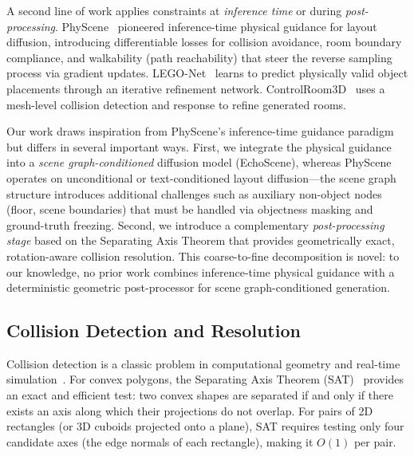 A second line of work applies constraints at \emph{inference time} or during \emph{post-processing}.
PhyScene~\cite{placeholder_physcene} pioneered inference-time physical guidance for layout diffusion, introducing differentiable losses for collision avoidance, room boundary compliance, and walkability (path reachability) that steer the reverse sampling process via gradient updates.
LEGO-Net~\cite{placeholder_legonet} learns to predict physically valid object placements through an iterative refinement network.
ControlRoom3D~\cite{placeholder_controlroom3d} uses a mesh-level collision detection and response to refine generated rooms.

Our work draws inspiration from PhyScene's inference-time guidance paradigm but differs in several important ways.
First, we integrate the physical guidance into a \emph{scene graph-conditioned} diffusion model (EchoScene), whereas PhyScene operates on unconditional or text-conditioned layout diffusion---the scene graph structure introduces additional challenges such as auxiliary non-object nodes (floor, scene boundaries) that must be handled via objectness masking and ground-truth freezing.
Second, we introduce a complementary \emph{post-processing stage} based on the Separating Axis Theorem that provides geometrically exact, rotation-aware collision resolution.
This coarse-to-fine decomposition is novel: to our knowledge, no prior work combines inference-time physical guidance with a deterministic geometric post-processor for scene graph-conditioned generation.

\subsection{Collision Detection and Resolution}
\label{sec:related:collision}

Collision detection is a classic problem in computational geometry and real-time simulation~\cite{placeholder_ericson_rtcd}.
For convex polygons, the Separating Axis Theorem (SAT)~\cite{placeholder_sat_gottschalk} provides an exact and efficient test: two convex shapes are separated if and only if there exists an axis along which their projections do not overlap.
For pairs of 2D rectangles (or 3D cuboids projected onto a plane), SAT requires testing only four candidate axes (the edge normals of each rectangle), making it $O(1)$ per pair.


